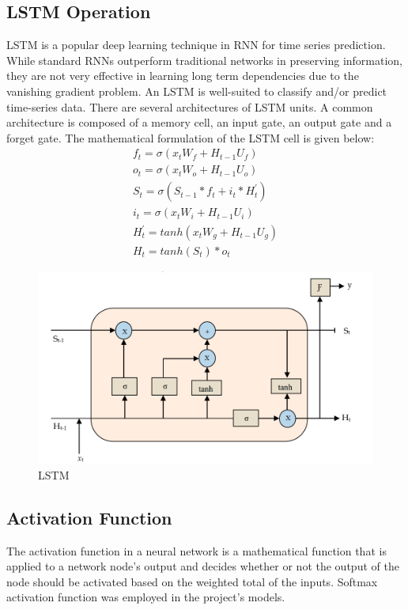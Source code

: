 \subsection{LSTM Operation}
\vspace{-18pt}
LSTM is a popular deep learning technique in RNN for time series prediction. While standard RNNs outperform traditional networks in preserving information, they are not very effective in learning long term dependencies due to the vanishing gradient problem. An LSTM is well-suited to classify and/or predict time-series data. There are several architectures of LSTM units. A common architecture is composed of a memory cell, an input gate, an output gate and a forget gate. The mathematical formulation of the LSTM cell is given below:
\begin{eqnarray}
	f_t = \sigma(x_tW_f + H_{t-1}U_f)\\
	o_t = \sigma(x_tW_o + H_{t-1}U_o)\\
	S_t = \sigma(S_{t-1} *f_t + i_t * H^{'}_t)\\
	i_t = \sigma(x_tW_i + H_{t-1}U_i)\\
	H^{'}_t = tanh(x_tW_g + H_{t-1}U_g)\\
	H_t = tanh(S_t)*o_t
\end{eqnarray}
\begin{figure}[tbh] %
	\begin{center}
		\includegraphics[width=6in]{images/l1.png} 
		\caption{LSTM} %
		\label{LSTM} %
	\end{center}
\end{figure}
\newpage
\subsection{Activation Function}
\vspace{-18pt}
The activation function in a neural network is a mathematical function that is applied to a network node's output and decides whether or not the output of the node should be activated based on the weighted total of the inputs. Softmax activation function was employed in the project's models.

